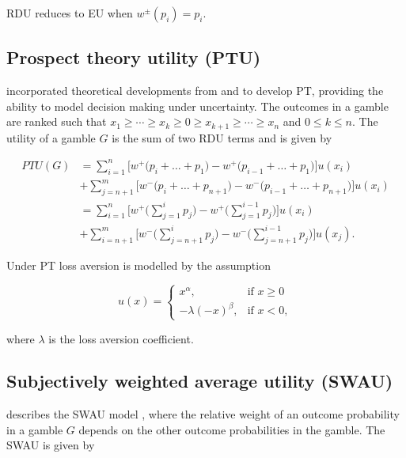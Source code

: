 \documentclass{article}\usepackage[]{graphicx}\usepackage[]{color}
\begin{document}
RDU reduces to EU when $w^\pm(p_i) = p_i$.

\subsection{Prospect theory utility (PTU)}

\cite{Tversky_Kahneman_1992} incorporated theoretical developments from \cite{Gilboa_1987} and \cite{Schmeidler_1989} to develop PT, providing the ability to model decision making under uncertainty. The outcomes in 
a gamble are ranked such that $x_1 \ge \cdots \ge x_k \ge 0 \ge x_{k+1} \ge \cdots \ge x_n$ and $0 \le k \le n$. The utility of a gamble $G$ is the sum of two RDU terms and is given by

\begin{equation}
\begin{split} 
PTU(G) &= \sum_{i=1}^{n} \Bigg[ w^+ \Bigg(p_i + \ldots + p_1\Bigg) - w^+\Bigg(p_{i-1} + \ldots + p_1\Bigg) \Bigg] u(x_i) \\
 & + \sum_{j=n+1}^{m} \Bigg[ w^- \Bigg(p_i + \ldots + p_{n+1}\Bigg) - w^-\Bigg(p_{i-1} + \ldots + p_{n+1}\Bigg) \Bigg] u(x_i)\\
&= \sum_{i=1}^{n} \Bigg[ w^+ \Bigg(\sum_{j=1}^{i} p_j\Bigg) - w^+\Bigg(\sum_{j=1}^{i-1} p_j\Bigg) \Bigg] u(x_i) \\
 & + \sum_{i=n+1}^{m} \Bigg[ w^- \Bigg(\sum_{j=n+1}^{i} p_j\Bigg) - w^-\Bigg(\sum_{j=n+1}^{i-1} p_j\Bigg) \Bigg] u(x_j).
\end{split}
\label{ptu_equation}
\end{equation}

Under PT loss aversion is modelled by the assumption

\begin{equation}
u(x) =
\begin{cases}
x^\alpha, &\text{if $x \geq 0$}\\
-\lambda (-x)^\beta, &\text{if $x < 0$},
\end{cases}
\label{pt_utility_function} 
\end{equation}

where $\lambda$ is the loss aversion coefficient.

\subsection{Subjectively weighted average utility (SWAU)}

\citet[][p. 35]{Birnbaum_1999} describes the SWAU model \citep*{Karmarkar_1978, Karmarkar_1979, Viscusi_1989, Lattimore_Baker_Witte_1992}, where the relative weight of an outcome probability in a gamble $G$ depends on the other outcome probabilities in the gamble. The SWAU is given by
\end{document}
